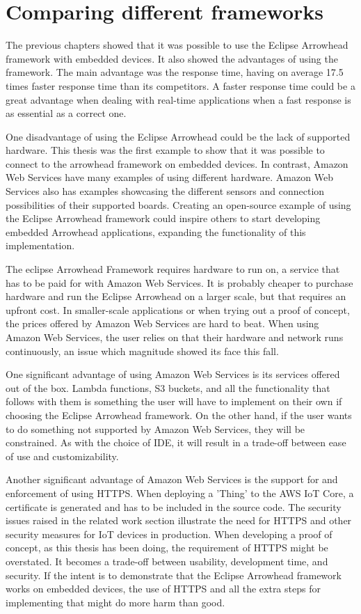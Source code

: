 \section{Comparing different frameworks}
The previous chapters showed that it was possible to use the Eclipse Arrowhead framework with embedded devices. It also showed the advantages of using the framework.
The main advantage was the response time, having on average 17.5 times faster response time than its competitors. 
A faster response time could be a great advantage when dealing with real-time applications when a fast response is as essential as a correct one. 

One disadvantage of using the Eclipse Arrowhead could be the lack of supported hardware.
This thesis was the first example to show that it was possible to connect to the arrowhead framework on embedded devices.
In contrast, Amazon Web Services have many examples of using different hardware. 
Amazon Web Services also has examples showcasing the different sensors and connection possibilities of their supported boards.
Creating an open-source example of using the Eclipse Arrowhead framework could inspire others to start developing embedded Arrowhead applications, expanding the functionality of this implementation.

The eclipse Arrowhead Framework requires hardware to run on, a service that has to be paid for with Amazon Web Services. 
It is probably cheaper to purchase hardware and run the Eclipse Arrowhead on a larger scale, but that requires an upfront cost.
In smaller-scale applications or when trying out a proof of concept, the prices offered by Amazon Web Services are hard to beat.
When using Amazon Web Services, the user relies on that their hardware and network runs continuously, an issue which magnitude showed its face this fall. 

One significant advantage of using Amazon Web Services is its services offered out of the box.
Lambda functions, S3 buckets, and all the functionality that follows with them is something the user will have to implement on their own if choosing the Eclipse Arrowhead framework.
On the other hand, if the user wants to do something not supported by Amazon Web Services, they will be constrained.
As with the choice of IDE, it will result in a trade-off between ease of use and customizability.

Another significant advantage of Amazon Web Services is the support for and enforcement of using HTTPS.
When deploying a 'Thing' to the AWS IoT Core, a certificate is generated and has to be included in the source code.
The security issues raised in the related work section illustrate the need for HTTPS and other security measures for IoT devices in production.
When developing a proof of concept, as this thesis has been doing, the requirement of HTTPS might be overstated.
It becomes a trade-off between usability, development time, and security. 
If the intent is to demonstrate that the Eclipse Arrowhead framework works on embedded devices, the use of HTTPS and all the extra steps for implementing that might do more harm than good. 

